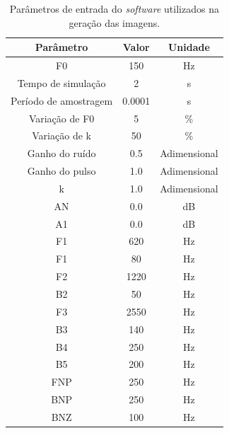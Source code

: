 \documentclass[
  12pt,       
  openright,      
  twoside,      
  a4paper,      
  english,      
  french,       
  spanish,      
  brazil,     
  ]{abntex2}
\begin{document}
\begin{table}[htb]
\centering
\ABNTEXfontereduzida
\caption[Parâmetros de entrada do \textit{software} utilizados na geração das imagens]{Parâmetros de entrada do \textit{software} utilizados na geração das imagens.}
\label{tab:parametrosImagens}
\begin{tabular}{ccc}
  \toprule
  Parâmetro & Valor & Unidade \\
    \midrule \midrule
    F0 & 150 & Hz\\
    \midrule
    Tempo de simulação & 2 & s\\
    \midrule
    Período de amostragem & 0.0001 & s\\
    \midrule
    Variação de F0 & 5 & \%\\
    \midrule
    Variação de k & 50 & \%\\
    \midrule
    Ganho do ruído & 0.5 & Adimensional\\
    \midrule
    Ganho do pulso & 1.0 & Adimensional\\
    \midrule
    k & 1.0 & Adimensional\\
    \midrule
    AN & 0.0 & dB\\
    \midrule
    A1 & 0.0 & dB\\
    \midrule
    F1 & 620 & Hz\\
    \midrule
    F1 & 80 & Hz\\
    \midrule
    F2 & 1220 & Hz\\
    \midrule
    B2 & 50 & Hz\\
    \midrule
    F3 & 2550 & Hz\\
    \midrule
    B3 & 140 & Hz\\
    \midrule
    B4 & 250 & Hz\\
    \midrule
    B5 & 200 & Hz\\
    \midrule
    FNP & 250 & Hz\\
    \midrule
    BNP & 250 & Hz\\
    \midrule
    BNZ & 100 & Hz\\
    \bottomrule
\end{tabular}
{
}
\end{table}
\end{document}
